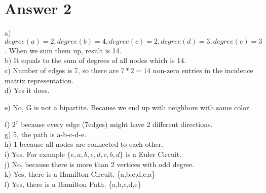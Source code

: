 \documentclass[12pt]{article}
\begin{document}
\section*{Answer 2}
a) $degree(a) = 2, degree(b) = 4, degree(c) = 2, degree(d) = 3 ,degree(e) = 3$. When we sum them up, result is 14.\\
b) It equals to the sum of degrees of all nodes which is 14. \\
c) Number of edges is 7, so there are $7*2=14$ non-zero entries in the incidence matrix representation. \\
d) Yes it does. \\
\begin{figure}[H]

\end{figure}
\newpage
e) No, G is not a bipartite. Because we end up with neighbors with same color.\\
\begin{figure}[H]

\end{figure}

f) $2^7$ because every edge (7edges) might have 2 different directions. \\
g) 5, the path is a-b-c-d-e.\\
h) 1 because all nodes are connected to each other. \\
i) Yes. For example $\{e, a, b, e, d, c, b, d\}$ is a Euler Circuit. \\
j) No, because there is more than 2 vertices with odd degree. \\
k) Yes, there is a Hamilton Circuit. \{a,b,c,d,e,a\}\\
l) Yes, there is a Hamilton Path. \{a,b,c,d,e\}\\
\end{document}
